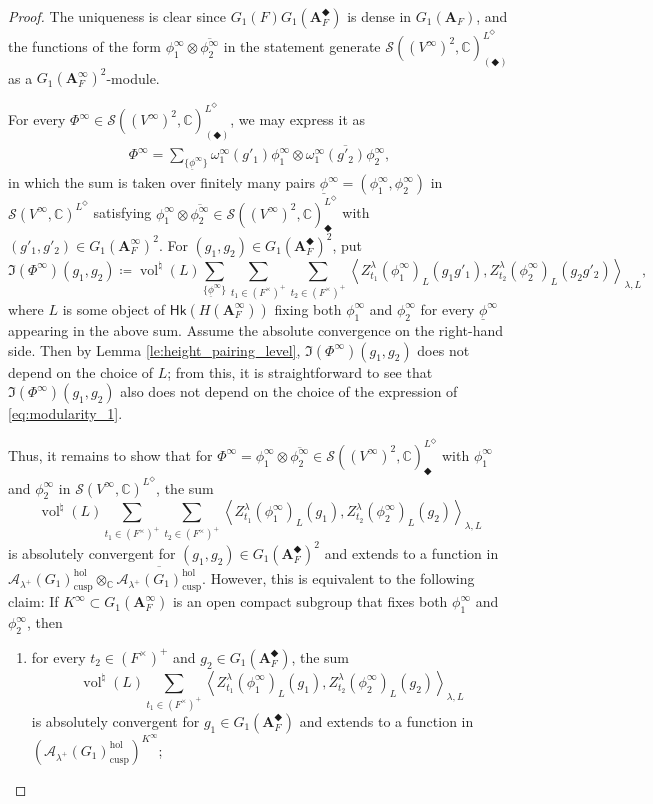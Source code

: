 \documentclass[12pt]{amsart}
\numberwithin{equation}{section}
\theoremstyle{plain}
\theoremstyle{definition}
\theoremstyle{remark}
\renewcommand{\b}[1]{\mathbf{#1}}
\renewcommand{\c}[1]{\mathcal{#1}}
\renewcommand{\d}[1]{\mathbb{#1}}
\newcommand{\f}[1]{\mathfrak{#1}}
\renewcommand{\r}[1]{\mathrm{#1}}
\newcommand{\s}[1]{\mathscr{#1}}
\renewcommand{\sf}[1]{\mathsf{#1}}
\renewcommand{\(}{\left(}
\renewcommand{\)}{\right)}
\newcommand{\ol}[1]{\overline{#1}{}}
\newcommand{\ul}{\underline}
\newcommand{\bA}{\b A}
\newcommand{\cA}{\c A}
\newcommand{\dC}{\d C}
\newcommand{\fI}{\f I}
\newcommand{\sS}{\s S}
\newcommand{\llangle}{\left\langle}
\newcommand{\rrangle}{\right\rangle}
\newcommand{\cusp}{\r{cusp}}
\newcommand{\hol}{\r{hol}}
\newcommand{\Hk}{\sf{Hk}}
\DeclareMathOperator{\vol}{vol}
\begin{document}
\begin{proof}
The uniqueness is clear since $G_1(F)G_1(\bA_F^\Diamondblack)$ is dense in $G_1(\bA_F)$, and the functions of the form $\phi^\infty_1\otimes\ol{\phi^\infty_2}$ in the statement generate $\sS((V^\infty)^2,\dC)^{L^\Diamond}_{(\Diamondblack)}$ as a $G_1(\bA_F^\infty)^2$-module.

For every $\Phi^\infty\in\sS((V^\infty)^2,\dC)^{L^\Diamond}_{(\Diamondblack)}$, we may express it as
\begin{align}\label{eq:modularity_1}
\Phi^\infty=\sum_{\{\ul\phi^\infty\}}\omega_1^\infty(g'_1)\phi^\infty_1\otimes\ol{\omega_1^\infty(g'_2)\phi^\infty_2},
\end{align}
in which the sum is taken over finitely many pairs $\ul\phi^\infty=(\phi^\infty_1,\phi^\infty_2)$ in $\sS(V^\infty,\dC)^{L^\Diamond}$ satisfying $\phi^\infty_1\otimes\ol{\phi^\infty_2}\in\sS((V^\infty)^2,\dC)^{L^\Diamond}_\Diamondblack$ with $(g'_1,g'_2)\in G_1(\bA_F^\infty)^2$. For $(g_1,g_2)\in G_1(\bA_F^\Diamondblack)^2$, put
\[
\fI(\Phi^\infty)(g_1,g_2)\coloneqq\vol^\natural(L)\sum_{\{\ul\phi^\infty\}}\sum_{t_1\in(F^\times)^+}\sum_{t_2\in(F^\times)^+}
\llangle Z^\lambda_{t_1}(\phi^\infty_1)_L(g_1 g'_1),Z^\lambda_{t_2}(\phi^\infty_2)_L(g_2 g'_2)\rrangle_{\lambda,L},
\]
where $L$ is some object of $\Hk(H(\bA_F^\infty))$ fixing both $\phi^\infty_1$ and $\phi^\infty_2$ for every $\ul\phi^\infty$ appearing in the above sum. Assume the absolute convergence on the right-hand side. Then by Lemma \ref{le:height_pairing_level}, $\fI(\Phi^\infty)(g_1,g_2)$ does not depend on the choice of $L$; from this, it is straightforward to see that $\fI(\Phi^\infty)(g_1,g_2)$ also does not depend on the choice of the expression of \eqref{eq:modularity_1}.

Thus, it remains to show that for $\Phi^\infty=\phi^\infty_1\otimes\ol{\phi^\infty_2}\in\sS((V^\infty)^2,\dC)^{L^\Diamond}_\Diamondblack$ with $\phi^\infty_1$ and $\phi^\infty_2$ in $\sS(V^\infty,\dC)^{L^\Diamond}$, the sum
\[
\vol^\natural(L)\sum_{t_1\in(F^\times)^+}\sum_{t_2\in(F^\times)^+}
\llangle Z^\lambda_{t_1}(\phi^\infty_1)_L(g_1),Z^\lambda_{t_2}(\phi^\infty_2)_L(g_2)\rrangle_{\lambda,L}
\]
is absolutely convergent for $(g_1,g_2)\in G_1(\bA_F^\Diamondblack)^2$ and extends to a function in $\cA_{\lambda^+}(G_1)_\cusp^\hol\otimes_\dC\ol{\cA_{\lambda^+}(G_1)_\cusp^\hol}$. However, this is equivalent to the following claim: If $K^\infty\subset G_1(\bA_F^\infty)$ is an open compact subgroup that fixes both $\phi^\infty_1$ and $\phi^\infty_2$, then
\begin{enumerate}
  \item for every $t_2\in(F^\times)^+$ and $g_2\in G_1(\bA_F^\Diamondblack)$, the sum
      \[
      \vol^\natural(L)\sum_{t_1\in(F^\times)^+}
      \llangle Z^\lambda_{t_1}(\phi^\infty_1)_L(g_1),Z^\lambda_{t_2}(\phi^\infty_2)_L(g_2)\rrangle_{\lambda,L}
      \]
      is absolutely convergent for $g_1\in G_1(\bA_F^\Diamondblack)$ and extends to a function in $(\cA_{\lambda^+}(G_1)_\cusp^\hol)^{K^\infty}$;


\end{enumerate}
\end{proof}
\end{document}
